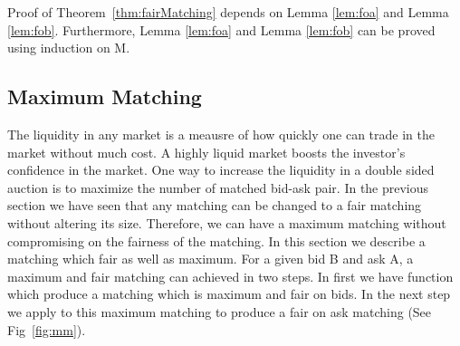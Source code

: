 \documentclass[a4paper,UKenglish,cleveref, autoref]{lipics-v2019}
\begin{document}
\begin{theorem}\label{thm:fairMatching}
\end{theorem}

Proof of Theorem~\ref{thm:fairMatching} depends on Lemma \ref{lem:foa} and Lemma \ref{lem:fob}. Furthermore, Lemma \ref{lem:foa} and Lemma \ref{lem:fob} can be proved using induction on M. 

\subsection{Maximum Matching}

The liquidity in any market is a meausre of how quickly one can trade in the market without much cost. A highly liquid market boosts the investor's confidence in the market. One way to increase the liquidity in a double sided auction is to maximize the number of matched bid-ask pair. In the previous section we have seen that any matching can be changed to a fair matching without altering its size. Therefore, we can have a maximum matching without compromising on the fairness of the matching. In this section we describe a matching which fair as well as maximum. For a given bid B and ask A, a maximum and fair matching can achieved in two steps. In first we have function  which produce a matching which is maximum and fair on bids. In the next step we apply  to this maximum matching to produce a fair on ask matching (See Fig~\ref{fig:mm}).
\end{document}
